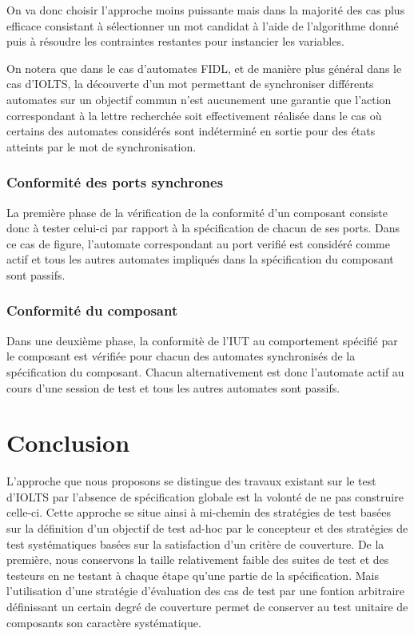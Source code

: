 On va donc choisir l'approche moins puissante mais dans la majorit\'e
des cas plus efficace consistant \`a s\'electionner un mot candidat
\`a l'aide de l'algorithme donn\'e puis \`a r\'esoudre les
contraintes restantes pour instancier les variables.

On notera que dans le cas d'automates \textsf{FIDL}, et de mani\`ere
plus g\'en\'eral dans le cas d'\textsf{IOLTS}, la d\'ecouverte d'un
mot permettant de synchroniser diff\'erents automates sur un objectif
commun n'est aucunement une garantie que l'action correspondant \`a
la lettre recherch\'ee soit effectivement r\'ealis\'ee dans le cas
o\`u certains des automates consid\'er\'es sont ind\'etermin\'e
en sortie pour des \'etats atteints par le mot de synchronisation. 
 
\subsubsection{Conformit\'e des ports synchrones}

La premi\`ere phase de la v\'erification de la conformit\'e d'un
composant consiste donc \`a tester celui-ci par rapport \`a la
sp\'ecification de chacun de ses ports. Dans ce cas de figure,
l'automate correspondant au port verifi\'e est consid\'er\'e comme
actif et tous les autres automates impliqu\'es dans la sp\'ecification
du composant sont passifs. 

\subsubsection{Conformit\'e du composant}

Dans une deuxi\`eme phase, la conformit\`e de l'\textsf{IUT} au
comportement sp\'ecifi\'e par le composant est v\'erifi\'ee pour
chacun des automates synchronis\'es de la sp\'ecification du
composant. Chacun alternativement est donc l'automate actif au cours
d'une session de test et tous les autres automates sont passifs. 

\section{Conclusion}

L'approche que nous proposons se distingue des travaux existant sur le
test d'\textsf{IOLTS} par l'absence de sp\'ecification globale est la
volont\'e de ne pas construire celle-ci. Cette approche se situe
ainsi \`a mi-chemin des strat\'egies de test bas\'ees sur la
d\'efinition d'un objectif de test ad-hoc par le concepteur et des
strat\'egies de test syst\'ematiques bas\'ees sur la satisfaction
d'un crit\`ere de couverture. De la premi\`ere, nous conservons la
taille relativement faible des suites de test et des testeurs en ne
testant \`a chaque \'etape qu'une partie de la
sp\'ecification. Mais l'utilisation d'une strat\'egie
d'\'evaluation des cas de test par une fontion arbitraire
d\'efinissant un certain degr\'e de couverture permet de conserver
au test unitaire de composants son caract\`ere syst\'ematique. 

